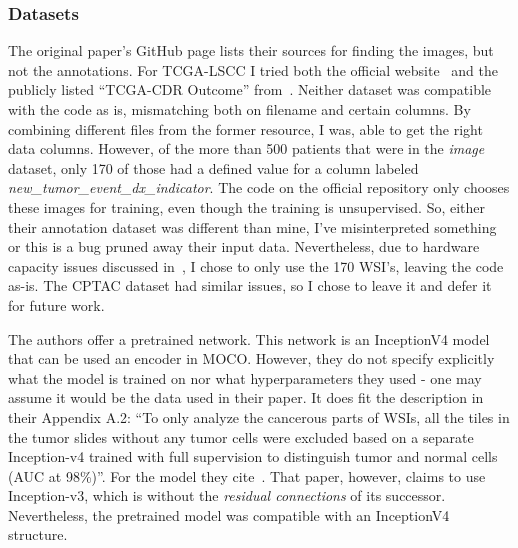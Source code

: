 \documentclass[10pt,twocolumn,letterpaper]{article}
\begin{document}
\subsubsection{Datasets}
The original paper's GitHub page lists their sources for finding the images, but not the annotations. For \gls{TCGA}-\gls{LSCC} I tried both the official website~\cite{tcgaAnnotation} and the publicly listed ``\gls{TCGA}-\gls{CDR} Outcome'' from~\cite{pancan}. Neither dataset was compatible with the code as is, mismatching both on filename and certain columns. By combining different files from the former resource, I was, able to get the right data columns. However, of the more than 500 patients that were in the \textit{image} dataset, only 170 of those had a defined value for a column labeled \textit{new\_tumor\_event\_dx\_indicator}. The code on the official repository only chooses these images for training, even though the training is unsupervised. So, either their annotation dataset was different than mine, I've misinterpreted something or this is a bug pruned away their input data. Nevertheless, due to hardware capacity issues discussed in~, I chose to only use the 170 \gls{WSI}'s, leaving the code as-is. The \gls{CPTAC} dataset had similar issues, so I chose to leave it and defer it for future work.

The authors offer a pretrained network. This network is an InceptionV4 model that can be used an encoder in \gls{MOCO}. However, they do not specify explicitly what the model is trained on nor what hyperparameters they used - one may assume it would be the data used in their paper. It does fit the description in their Appendix A.2: ``To only analyze the cancerous parts of WSIs, all the tiles in the tumor slides without any tumor cells were excluded based on a separate Inception-v4 trained with full supervision to distinguish tumor and normal
cells (AUC at 98\%)''. For the model they cite~\cite{coudray2018classification}. That paper, however, claims to use Inception-v3, which is without the \textit{residual connections} of its successor. Nevertheless, the pretrained model was compatible with an InceptionV4 structure.
\end{document}
